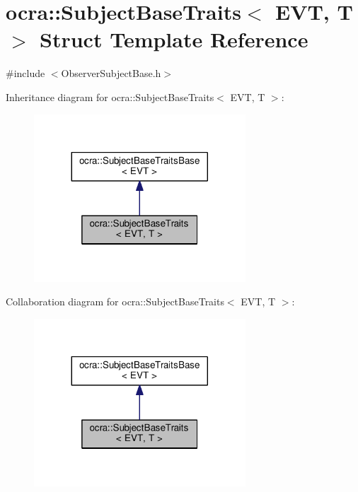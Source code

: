 \hypertarget{structocra_1_1SubjectBaseTraits}{}\section{ocra\+:\+:Subject\+Base\+Traits$<$ E\+VT, T $>$ Struct Template Reference}
\label{structocra_1_1SubjectBaseTraits}


{\ttfamily \#include $<$Observer\+Subject\+Base.\+h$>$}



Inheritance diagram for ocra\+:\+:Subject\+Base\+Traits$<$ E\+VT, T $>$\+:
\nopagebreak
\begin{figure}[H]
\begin{center}
\leavevmode
\includegraphics[width=224pt]{d3/dc3/structocra_1_1SubjectBaseTraits__inherit__graph}
\end{center}
\end{figure}


Collaboration diagram for ocra\+:\+:Subject\+Base\+Traits$<$ E\+VT, T $>$\+:
\nopagebreak
\begin{figure}[H]
\begin{center}
\leavevmode
\includegraphics[width=224pt]{de/d9b/structocra_1_1SubjectBaseTraits__coll__graph}
\end{center}
\end{figure}
